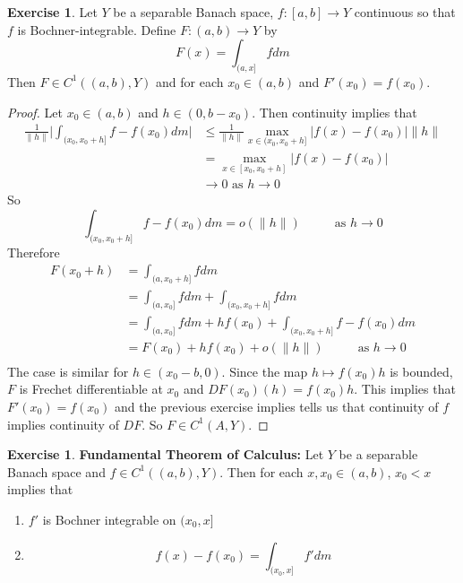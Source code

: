 \documentclass[12pt]{amsart}
\theoremstyle{definition}
\newtheorem{ex}[definition]{Exercise}
\begin{document}
	\begin{ex}
	Let $Y$ be a separable Banach space, $f:[a,b] \rightarrow Y$ continuous so that $f$ is Bochner-integrable. Define $F:(a,b) \rightarrow Y$ by  $$F(x) = \int_{(a, x]}f dm$$ Then $F \in C^1((a,b), Y)$ and for each $x_0 \in (a,b)$ and $F'(x_0) = f(x_0)$.
	\end{ex}
	
	\begin{proof}
	Let $x_0 \in (a,b)$ and $h \in (0, b-x_0)$. Then continuity implies that
	\begin{align*}
	\frac{1}{\|h\|} \bigg | \int_{(x_0, x_0 + h]}f - f(x_0) dm \bigg |
	& \leq  \frac{1}{\|h\|} \max_{x \in (x_0, x_0+h]} |f(x) - f(x_0)| \|h\| \\
	&= \max_{x \in [x_0, x_0+h]} |f(x) - f(x_0)| \\
	& \rightarrow 0  \text{ as } h \rightarrow 0
\end{align*}	  
So $$\int_{(x_0, x_0 + h]}f - f(x_0) dm = o(\|h\|) \hspace{1cm}\text{ as }h \rightarrow 0$$ 
	Therefore 
	\begin{align*}
	F(x_0 + h)
	&= \int_{(a, x_0 + h]} f dm  \\
	&= \int_{(a, x_0]} f dm + \int_{(x_0, x_0 + h]} fdm \\
	&= \int_{(a, x_0]} f dm + hf(x_0) + \int_{(x_0, x_0 + h]} f - f(x_0) dm \\ 
	&= F(x_0 ) + hf(x_0) + o(\|h\|) \hspace{1cm }\text{ as } h \rightarrow 0\\
	\end{align*}
	The case is similar for $h \in (x_0 - b, 0)$. Since the map $h \mapsto f(x_0)h$ is bounded, $F$ is Frechet differentiable at $x_0$ and $DF(x_0)(h) = f(x_0)h$. This implies that $F'(x_0) = f(x_0)$ and the previous exercise implies tells us that continuity of $f$ implies continuity of $DF$. So $F \in C^1(A, Y)$.
	\end{proof}
	
	\begin{ex}\textbf{Fundamental Theorem of Calculus:}
	Let $Y$ be a separable Banach space and $f \in C^1((a,b), Y)$. Then for each $x, x_0 \in (a,b)$, $x_0 < x$ implies that 
	\begin{enumerate}
	\item $f'$ is Bochner integrable on $(x_0, x]$ 
	\item  $$f(x) - f(x_0) = \int_{(x_0, x]}f'dm$$ 
	\end{enumerate}
	\end{ex}
\end{document}
